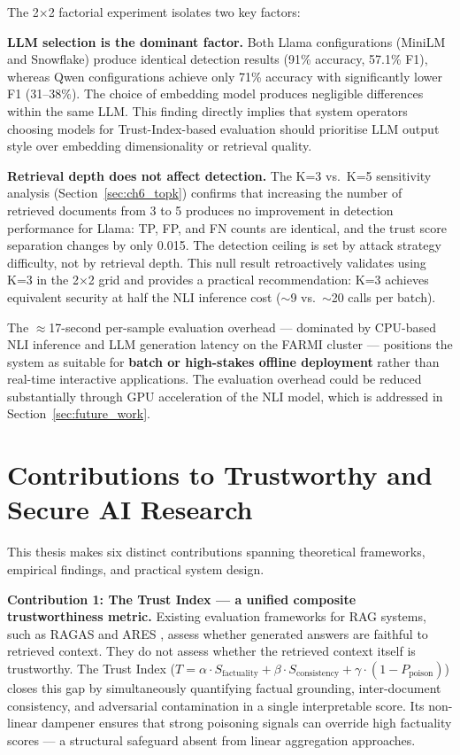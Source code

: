 The 2×2 factorial experiment isolates two key factors:

\textbf{LLM selection is the dominant factor.} Both Llama configurations (MiniLM and Snowflake) produce identical detection results (91\% accuracy, 57.1\% F1), whereas Qwen configurations achieve only 71\% accuracy with significantly lower F1 (31--38\%). The choice of embedding model produces negligible differences within the same LLM. This finding directly implies that system operators choosing models for Trust-Index-based evaluation should prioritise LLM output style over embedding dimensionality or retrieval quality.

\textbf{Retrieval depth does not affect detection.} The K=3 vs.\ K=5 sensitivity analysis (Section~\ref{sec:ch6_topk}) confirms that increasing the number of retrieved documents from 3 to 5 produces no improvement in detection performance for Llama: TP, FP, and FN counts are identical, and the trust score separation changes by only 0.015. The detection ceiling is set by attack strategy difficulty, not by retrieval depth. This null result retroactively validates using K=3 in the 2×2 grid and provides a practical recommendation: K=3 achieves equivalent security at half the NLI inference cost ($\sim$9 vs.\ $\sim$20 calls per batch).

The $\approx$17-second per-sample evaluation overhead --- dominated by CPU-based NLI inference and LLM generation latency on the FARMI cluster --- positions the system as suitable for \textbf{batch or high-stakes offline deployment} rather than real-time interactive applications. The evaluation overhead could be reduced substantially through GPU acceleration of the NLI model, which is addressed in Section~\ref{sec:future_work}.

\section{Contributions to Trustworthy and Secure AI Research}
\label{sec:disc_contributions}

This thesis makes six distinct contributions spanning theoretical frameworks, empirical findings, and practical system design.

\textbf{Contribution 1: The Trust Index — a unified composite trustworthiness metric.}
Existing evaluation frameworks for RAG systems, such as RAGAS \parencite{es2024ragas} and ARES \parencite{saadfalcon2024ares}, assess whether generated answers are faithful to retrieved context. They do not assess whether the retrieved context itself is trustworthy. The Trust Index ($T = \alpha \cdot S_{\text{factuality}} + \beta \cdot S_{\text{consistency}} + \gamma \cdot (1 - P_{\text{poison}})$) closes this gap by simultaneously quantifying factual grounding, inter-document consistency, and adversarial contamination in a single interpretable score. Its non-linear dampener ensures that strong poisoning signals can override high factuality scores --- a structural safeguard absent from linear aggregation approaches.

